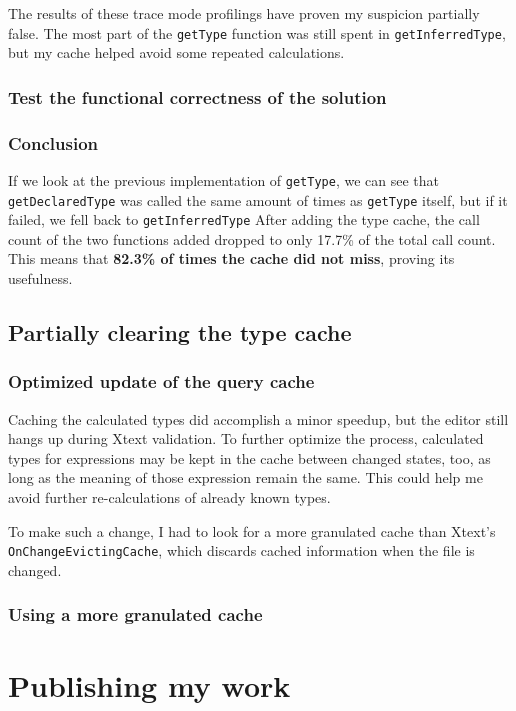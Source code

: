 \documentclass[11pt,a4paper,oneside]{report}
\begin{document}
The results of these trace mode profilings have proven my suspicion partially
false. The most part of the \texttt{getType} function was still spent in
\texttt{getInferredType}, but my cache helped avoid some repeated calculations.

\subsection{Test the functional correctness of the solution}

\subsection{Conclusion}
If we look at the previous implementation of \texttt{getType}, we can see that
\texttt{getDeclaredType} was called the same amount of times as
\texttt{getType} itself, but if it failed, we fell back to
\texttt{getInferredType} After adding the type cache, the call count of the two
functions added dropped to only 17.7\% of the total call count. This means that
\textbf{82.3\% of times the cache did not miss}, proving its usefulness.

\section{Partially clearing the type cache}
\subsection{Optimized update of the query cache}
Caching the calculated types did accomplish a minor speedup, but the editor
still hangs up during Xtext validation. To further optimize the process,
calculated types for expressions may be kept in the cache between changed
states, too, as long as the meaning of those expression remain the same. This
could help me avoid further re-calculations of already known types.

To make such a change, I had to look for a more granulated cache than Xtext's
\texttt{OnChangeEvictingCache}, which discards cached information when the file
is changed.

\subsection{Using a more granulated cache}

\chapter{Publishing my work}
\end{document}
